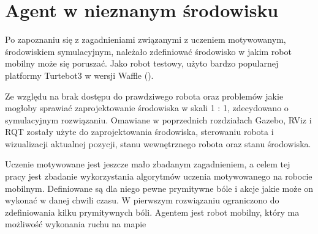 \chapter{Agent w nieznanym środowisku}
\label{praktyka_ml}

Po zapoznaniu się z zagadnieniami związanymi z uczeniem motywowanym, środowiskiem
symulacyjnym, należało zdefiniować środowisko w jakim robot mobilny może się poruszać.
Jako robot testowy, użyto bardzo popularnej platformy Turtebot3 w wersji Waffle
(\cite{turtebot3}).

Ze względu na brak dostępu do prawdziwego robota oraz problemów jakie mogłoby sprawiać
zaprojektowanie środowiska w skali 1 : 1, zdecydowano o symulacyjnym rozwiązaniu.
Omawiane w poprzednich rozdziałach Gazebo, RViz i RQT zostały użyte do zaprojektowania
środowiska, sterowaniu robota i wizualizacji aktualnej pozycji, stanu wewnętrznego 
robota oraz stanu środowiska.

Uczenie motywowane jest jeszcze mało zbadanym zagadnieniem, a celem tej pracy jest
zbadanie wykorzystania algorytmów uczenia motywowanego na robocie mobilnym.
Definiowane są dla niego pewne prymitywne bóle i akcje jakie może on wykonać w danej
chwili czasu. W pierwszym rozwiązaniu ograniczono do zdefiniowania kilku prymitywnych bóli.
Agentem jest robot mobilny, który ma możliwość wykonania ruchu na mapie